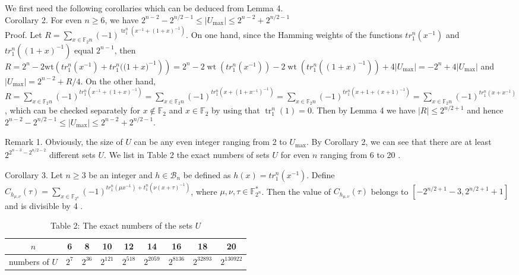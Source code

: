 \documentclass[10pt]{article}
\begin{document}
We first need the following corollaries which can be deduced from Lemma 4.\\
Corollary 2. For even $n \geq 6$, we have $2^{n-2}-2^{n / 2-1} \leq\left|U_{\max }\right| \leq 2^{n-2}+2^{n / 2-1}$\\
Proof. Let $R=\sum_{x \in \mathbb{F}_{2} n}(-1)^{\operatorname{tr}_{1}^{n}\left(x^{-1}+(1+x)^{-1}\right)}$. On one hand, since the Hamming weights of the functions $t r_{1}^{n}\left(x^{-1}\right)$ and $t r_{1}^{n}\left((1+x)^{-1}\right)$ equal $2^{n-1}$, then $R=2^{n}-2 \mathrm{wt}\left(t r_{1}^{n}\left(x^{-1}\right)+t r_{1}^{n}((1+\right. \left.\left.x)^{-1}\right)\right)=2^{n}-2 \operatorname{wt}\left(t r_{1}^{n}\left(x^{-1}\right)\right)-2 \operatorname{wt}\left(t r_{1}^{n}\left((1+x)^{-1}\right)\right)+4\left|U_{\max }\right|=-2^{n}+4\left|U_{\max }\right|$ and $\left|U_{\max }\right|= 2^{n-2}+R / 4$. On the other hand, $R=\sum_{x \in \mathbb{F}_{2} n}(-1)^{t r_{1}^{n}\left(x^{-1}+(1+x)^{-1}\right)}=\sum_{x \in \mathbb{F}_{2} n}(-1)^{t r_{1}^{n}\left(x+\left(1+x^{-1}\right)^{-1}\right)}= \sum_{x \in \mathbb{F}_{2} n}(-1)^{t r_{1}^{n}\left(x+1+(x+1)^{-1}\right)}=\sum_{x \in \mathbb{F}_{2} n}(-1)^{t r_{1}^{n}\left(x+x^{-1}\right)}$, which can be checked separately for $x \notin \mathbb{F}_{2}$ and $x \in \mathbb{F}_{2}$ by using that $\operatorname{tr}_{1}^{n}(1)=0$. Then by Lemma 4 we have $|R| \leq 2^{n / 2+1}$ and hence $2^{n-2}-2^{n / 2-1} \leq\left|U_{\max }\right| \leq 2^{n-2}+2^{n / 2-1}$.

Remark 1. Obviously, the size of $U$ can be any even integer ranging from 2 to $U_{\max }$. By Corollary 2, we can see that there are at least $2^{2^{n-3}-2^{n / 2-2}}$ different sets $U$. We list in Table 2 the exact numbers of sets $U$ for even $n$ ranging from 6 to 20 .

Corollary 3. Let $n \geq 3$ be an integer and $h \in \mathcal{B}_{n}$ be defined as $h(x)=t r_{1}^{n}\left(x^{-1}\right)$. Define $C_{h_{\mu, \nu}}(\tau)=\sum_{x \in \mathbb{F}_{2^{n}}}(-1)^{t r_{1}^{n}\left(\mu x^{-1}\right)+t_{1}^{n}\left(\nu(x+\tau)^{-1}\right)}$, where $\mu, \nu, \tau \in \mathbb{F}_{2^{n}}^{*}$. Then the value of $C_{h_{\mu, \nu}}(\tau)$ belongs to $\left[-2^{n / 2+1}-3,2^{n / 2+1}+1\right]$ and is divisible by 4 .

\begin{table}[h]
\begin{center}
\captionsetup{labelformat=empty}
\caption{Table 2: The exact numbers of the sets $U$}
\begin{tabular}{|c|c|c|c|c|c|c|c|c|}
\hline
$n$ & 6 & 8 & 10 & 12 & 14 & 16 & 18 & 20 \\
\hline
numbers of $U$ & $2^{7}$ & $2^{36}$ & $2^{121}$ & $2^{518}$ & $2^{2059}$ & $2^{8136}$ & $2^{32893}$ & $2^{130922}$ \\
\hline
\end{tabular}
\end{center}
\end{table}
\end{document}
